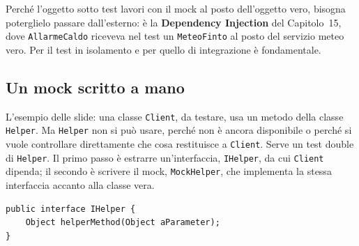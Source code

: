 
Perché l'oggetto sotto test lavori con il mock al posto dell'oggetto vero, bisogna poterglielo passare dall'esterno: è la
\textbf{Dependency Injection} del Capitolo~15, dove \texttt{AllarmeCaldo} riceveva nel test un \texttt{MeteoFinto} al
posto del servizio meteo vero. Per il test in isolamento e per quello di integrazione è fondamentale.

\subsection{Un mock scritto a mano}

L'esempio delle slide: una classe \texttt{Client}, da testare, usa un metodo della classe \texttt{Helper}. Ma
\texttt{Helper} non si può usare, perché non è ancora disponibile o perché si vuole controllare direttamente che cosa
restituisce a \texttt{Client}. Serve un test double di \texttt{Helper}. Il primo passo è estrarre un'interfaccia,
\texttt{IHelper}, da cui \texttt{Client} dipenda; il secondo è scrivere il mock, \texttt{MockHelper}, che implementa la
stessa interfaccia accanto alla classe vera.

\begin{center}
\end{center}

\begin{lstlisting}[style=java, name=IHelper.java]
public interface IHelper {
    Object helperMethod(Object aParameter);
}
\end{lstlisting}

